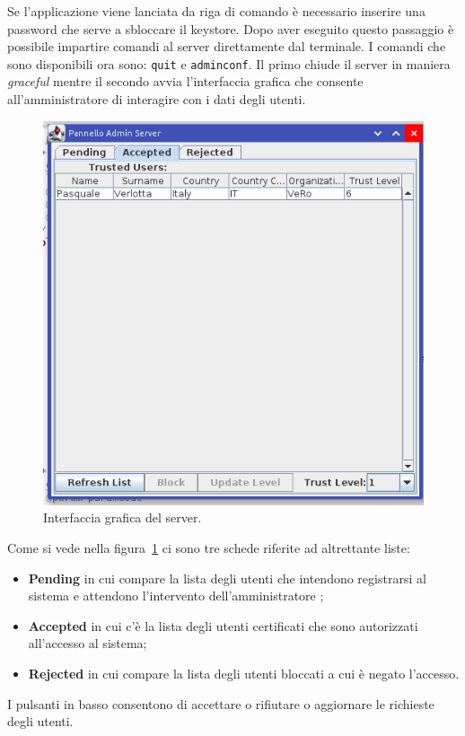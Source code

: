 Se l'applicazione viene lanciata da riga di comando è necessario inserire una password che serve a sbloccare il keystore. Dopo aver eseguito questo passaggio è possibile impartire comandi al server direttamente dal terminale. I comandi che sono disponibili ora sono: \texttt{quit} e \texttt{adminconf}.
Il primo chiude il server in maniera \emph{graceful} mentre il secondo avvia l'interfaccia grafica che consente all'amministratore di interagire con i dati degli utenti.
	\begin{center}	
		\begin{figure}[H]
		\centering
		\includegraphics[scale=0.7]{Immagini/server_accepted}
		\caption[GUI del server]{Interfaccia grafica del server.}
		\label{fig:servergui}
		\end{figure}
	\end{center}
Come si vede nella figura~\ref{fig:servergui} ci sono tre schede riferite ad altrettante liste: 
\begin{itemize}
	\item \textbf{Pending} in cui compare la lista degli utenti che intendono registrarsi al sistema e attendono l'intervento dell'amministratore ;
	\item \textbf{Accepted} in cui c'è la lista degli utenti certificati che sono autorizzati all'accesso al sistema;
	\item \textbf{Rejected} in cui compare la lista degli utenti bloccati a cui è negato l'accesso.
\end{itemize}
I pulsanti in basso consentono di accettare o rifiutare o aggiornare le richieste degli utenti.

